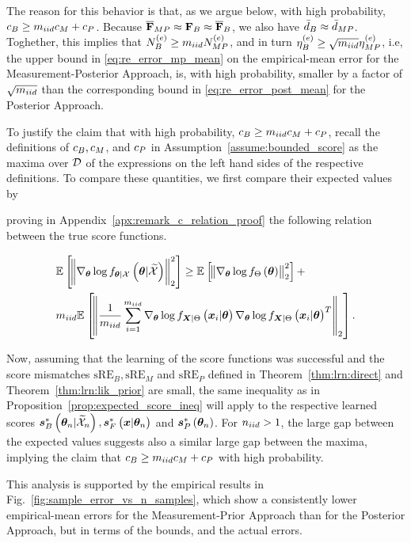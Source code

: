 {The reason for this behavior is that, as we argue below, with high probability, $c_B\geq m_{iid} c_M +c_P$. Because $\overline{\mathbf{F}}_{MP}\approx \mathbf{F}_{B} \approx \overline{\mathbf{F}}_{B} $, we also have ${\bar{d}_B} \approx {\bar{d}_{MP}}$. Toghether, this implies that $N_B^{(e)} \geq m_{iid} N_{MP}^{(e)}$, and in turn
$\eta_{B}^{(e)} \geq \sqrt{m_{iid}}\eta_{MP}^{(e)}$, i.e, the upper bound in \eqref{eq:re_error_mp_mean} on the empirical-mean error for the Measurement-Posterior Approach, is, with high probability, smaller by a factor of $\sqrt{m_{iid}}$ than the corresponding bound in \eqref{eq:re_error_post_mean} for the Posterior Approach. 

To justify the claim that with high probability, $c_B\geq m_{iid} c_M +c_P$, 
recall the definitions of $c_B, c_M$, and $c_P$ in Assumption~\ref{assume:bounded_score} as the maxima over $\mathcal{D}$ of the expressions on the left hand sides of the respective definitions. To compare these quantities, we first compare their expected values by} proving in Appendix~\ref{apx:remark_c_relation_proof} the following relation between the true score functions.
\begin{prop} \label{prop:expected_score_ineq}
    \begin{align}
&\expectation{\norm{\nabla_{\p}\log\probt{\p|\xsetr}{\p|\xset}}_2^2}{}\geq\expectation{\norm{\nabla_{\p}\log\probt{\p}{\pr}}_2^2}{}+\nonumber\\
    &\niiddata \expectation{\norm{\frac{1}{\niiddata}\sum_{i=1}^{\niiddata}\nabla_{\p}\log\probt{\x_i|\p}{\X|\pr}\nabla_{\p}\log\probt{\x_i|\p}{\X|\pr}^T}_2}{}.\nonumber
\end{align}
\end{prop}
{Now, assuming that the learning of the score functions was successful and the score mismatches $\mathrm{sRE}_B, \mathrm{sRE}_M$ and $\mathrm{sRE}_P$ defined in Theorem~\ref{thm:lrn:direct} and Theorem~\ref{thm:lrn:lik_prior} are small, the same inequality as in Proposition~\ref{prop:expected_score_ineq} will apply to the respective learned scores $\bm{s}_{B}^*\left(\bm{\theta}_n|\widetilde{\mathcal{X}}_n\right),\bm{s}_{F}^*\left(\bm{x}|\bm{\theta}_n\right)$ and $\bm{s}_{P}^*\left(\bm{\theta}_n\right)$. For $n_{iid}>1$, the large gap between the expected values suggests also a similar large gap between the maxima, implying the claim that $c_B\geq m_{iid} c_M +c_P$ with high probability. 

This analysis is supported by the empirical results in Fig.~\ref{fig:sample_error_vs_n_samples}, which show a consistently lower empirical-mean errors for the Measurement-Prior Approach than for the Posterior Approach, but in terms of the bounds, and the actual errors.
 }


